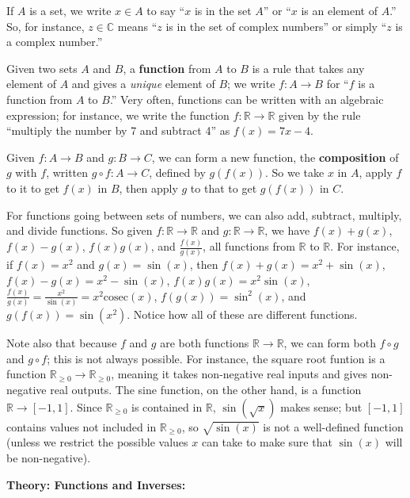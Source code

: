 \documentclass{article}
\begin{document}
If $A$ is a set, we write $x\in A$ to say ``$x$ is in the set $A$'' or ``$x$ is an element of $A$.'' So, for instance, $z\in\mathbb{C}$ means ``$z$ is in the set of complex numbers'' or simply ``$z$ is a complex number.''

Given two sets $A$ and $B$, a \textbf{function} from $A$ to $B$ is a rule that takes any element of $A$ and gives a \textit{unique} element of $B$; we write $f:A\to B$ for ``$f$ is a function from $A$ to $B$.'' Very often, functions can be written with an algebraic expression; for instance, we write the function $f:\mathbb{R}\to \mathbb{R}$ given by the rule ``multiply the number by 7 and subtract 4'' as $f(x)=7x-4$.

Given $f:A\to B$ and $g:B\to C$, we can form a new function, the \textbf{composition} of $g$ with $f$, written $g\circ f:A\to C$, defined by $g(f(x))$. So we take $x$ in $A$, apply $f$ to it to get $f(x)$ in $B$, then apply $g$ to that to get $g(f(x))$ in $C$.

For functions going between sets of numbers, we can also add, subtract, multiply, and divide functions. So given $f:\mathbb{R}\to\mathbb{R}$ and $g:\mathbb{R}\to\mathbb{R}$, we have $f(x)+g(x)$, $f(x)-g(x)$, $f(x)g(x)$, and $\frac{f(x)}{g(x)}$, all functions from $\mathbb{R}$ to $\mathbb{R}$. For instance, if $f(x)=x^2$ and $g(x)=\sin(x)$, then $f(x)+g(x)=x^2+\sin(x)$, $f(x)-g(x)=x^2-\sin(x)$, $f(x)g(x)=x^2\sin(x)$, $\frac{f(x)}{g(x)}=\frac{x^2}{\sin(x)}=x^2\mathrm{cosec}(x)$, $f(g(x))=\sin^2(x)$, and $g(f(x))=\sin(x^2)$. Notice how all of these are different functions.

Note also that because $f$ and $g$ are both functions $\mathbb{R}\to\mathbb{R}$, we can form both $f\circ g$ and $g\circ f$; this is not always possible. For instance, the square root funtion is a function $\mathbb{R}_{\geq 0}\to\mathbb{R}_{\geq0}$, meaning it takes non-negative real inputs and gives non-negative real outputs. The sine function, on the other hand, is a function $\mathbb{R}\to[-1,1]$. Since $\mathbb{R}_{\geq 0}$ is contained in $\mathbb{R}$, $\sin(\sqrt{x})$ makes sense; but $[-1,1]$ contains values not included in $\mathbb{R}_{\geq 0}$, so $\sqrt{\sin(x)}$ is not a well-defined function (unless we restrict the possible values $x$ can take to make sure that $\sin(x)$ will be non-negative).

\clearpage








\textbf{Theory: Functions and Inverses:}
\end{document}
